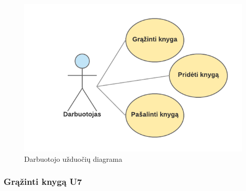 \documentclass{VUMIFPSkursinis}
\begin{document}
\begin{figure}[H]
\label{fig:ucDarb}
    \centering
    \includegraphics[width=1\textwidth]{vidines/ucDarb}
	\caption{Darbuotojo užduočių diagrama}
\end{figure}

\pagebreak

\subsubsection{Grąžinti knygą U7}
\end{document}
